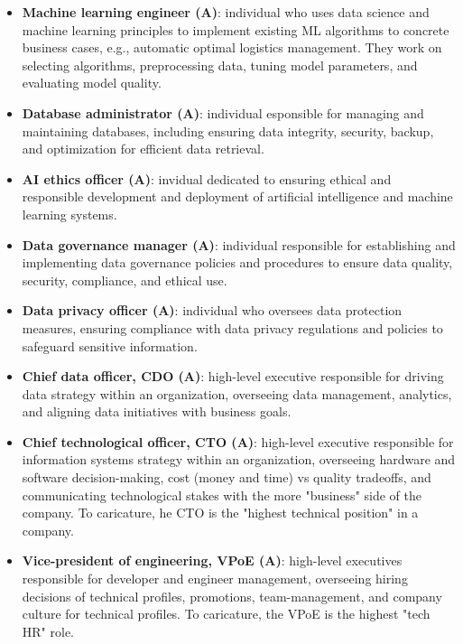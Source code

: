 \documentclass{article}
\begin{document}
\begin{itemize}
	\item \textbf{Machine learning engineer (A)}: individual who uses data science and machine learning principles to implement existing ML algorithms to concrete business cases, e.g., automatic optimal logistics management. They work on selecting algorithms, preprocessing data, tuning model parameters, and evaluating model quality.

	\item \textbf{Database administrator (A)}: individual esponsible for managing and maintaining databases, including ensuring data integrity, security, backup, and optimization for efficient data retrieval.

	\item \textbf{AI ethics officer (A)}: invidual dedicated to ensuring ethical and responsible development and deployment of artificial intelligence and machine learning systems.

	\item \textbf{Data governance manager (A)}: individual responsible for establishing and implementing data governance policies and procedures to ensure data quality, security, compliance, and ethical use.

	\item \textbf{Data privacy officer (A)}: individual who oversees data protection measures, ensuring compliance with data privacy regulations and policies to safeguard sensitive information.

	\item \textbf{Chief data officer, CDO (A)}: high-level executive responsible for driving data strategy within an organization, overseeing data management, analytics, and aligning data initiatives with business goals.

	\item \textbf{Chief technological officer, CTO (A)}: high-level executive responsible for information systems strategy within an organization, overseeing hardware and software decision-making, cost (money and time) vs quality tradeoffs, and communicating technological stakes with the more "business" side of the company. To caricature, he CTO is the "highest technical position" in a company.

	\item \textbf{Vice-president of engineering, VPoE (A)}: high-level executives responsible for developer and engineer management, overseeing hiring decisions of technical profiles, promotions, team-management, and company culture for technical profiles. To caricature, the VPoE is the highest "tech HR" role.

\end{itemize}
\end{document}
